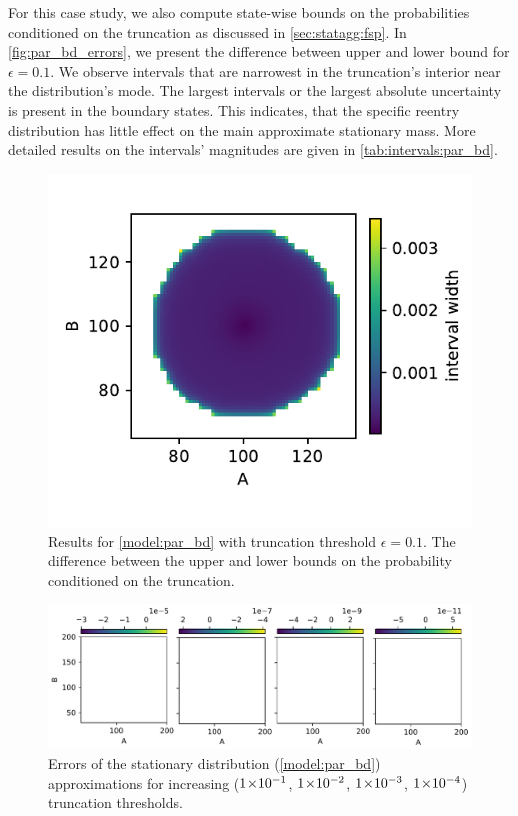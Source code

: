 For this case study, we also compute state-wise bounds on the
probabilities conditioned on the truncation as discussed in
\autoref{sec:statagg:fsp}.
In \autoref{fig:par_bd_errors}, we present the difference between
upper and lower bound for $\epsilon=0.1$.
We observe intervals that are narrowest in the truncation's interior
near the distribution's mode.
The largest intervals or the largest absolute uncertainty is present
in the boundary states.
This indicates, that the specific reentry distribution has little
effect on the main approximate stationary mass.
More detailed results on the intervals' magnitudes are given in
\autoref{tab:intervals:par_bd}.
\begin{figure}[htb]
  \centering
  \includegraphics[width=.6\textwidth]{gfx/diffs.pdf}
  \caption[Probability bound widths]{Results for
    \autoref{model:par_bd} with truncation threshold $\epsilon=0.1$.
    The difference between the upper and lower bounds on the
  probability conditioned on the truncation.}
  \label{fig:par_bd_errors}
\end{figure}
\begin{figure}[htb]
  \centering
  \includegraphics[width=\textwidth]{gfx/par_bd_errs.pdf}
  \caption[Stationary distribution
  errors]{\label{fig:par_bd_errs}Errors of the stationary
    distribution (\autoref{model:par_bd}) approximations for increasing
  ($ 1\!\times\hspace{-.5ex} 10^{-1} $, $ 1\!\times\hspace{-.5ex} 10^{-2} $, $ 1\!\times\hspace{-.5ex} 10^{-3} $, $ 1\!\times\hspace{-.5ex} 10^{-4} $) truncation thresholds.}
\end{figure}

